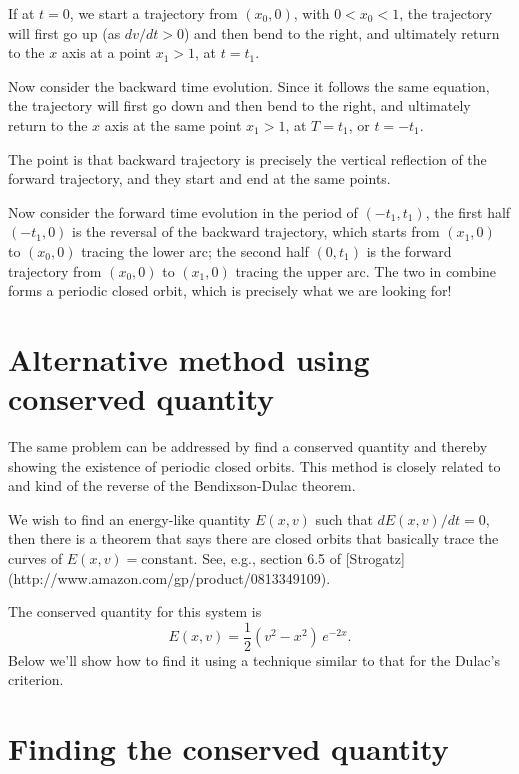 \documentclass{article}
\begin{document}
If at $t = 0$, we start a trajectory from $(x_0, 0)$, with $0 < x_0 < 1$, the trajectory will first go up (as $dv/dt > 0$) and then bend to the right, and ultimately return to the $x$ axis at a point $x_1 > 1$, at $t = t_1$.

Now consider the backward time evolution.  Since it follows the same equation, the trajectory will first go down and then bend to the right, and ultimately return to the $x$ axis at the same point $x_1 > 1$, at $T = t_1$, or $t = -t_1$.

The point is that backward trajectory is precisely the vertical reflection of the forward trajectory, and they start and end at the same points.

Now consider the forward time evolution in the period of $(-t_1, t_1)$, the first half $(-t_1, 0)$ is the reversal of the backward trajectory, which starts from $(x_1, 0)$ to $(x_0, 0)$ tracing the lower arc; the second half $(0, t_1)$ is the forward trajectory from $(x_0, 0)$ to $(x_1, 0)$ tracing the upper arc.  The two in combine forms a periodic closed orbit, which is precisely what we are looking for!



\section{ Alternative method using conserved quantity }


The same problem can be addressed by find a conserved quantity and thereby showing the existence of periodic closed orbits.  This method is closely related to and kind of the reverse of the Bendixson-Dulac theorem.

We wish to find an energy-like quantity $E(x, v)$ such  that $dE(x, v)/dt = 0$, then there is a theorem that says there are closed orbits that basically trace the curves of $E(x, v) = \mathrm{constant}$.  See, e.g., section 6.5 of [Strogatz](http://www.amazon.com/gp/product/0813349109).

The conserved quantity for this system is
$$
E(x, v) = \frac{1}{2} (v^2 - x^2) \, e^{-2x}.
$$
Below we'll show how to find it using a technique similar to that for the Dulac's criterion.


\section{ Finding the conserved quantity }
\end{document}
